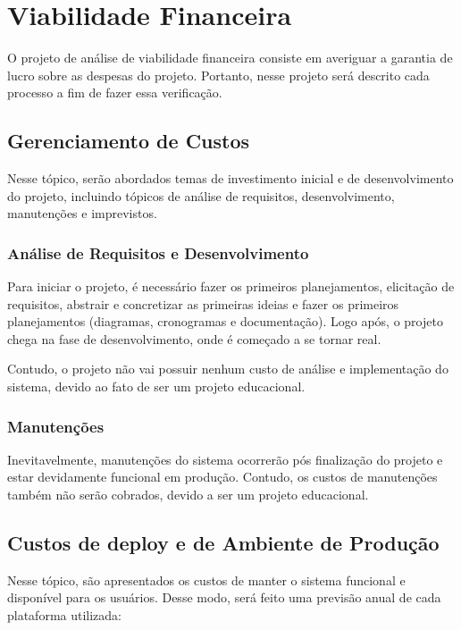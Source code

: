 \chapter{Viabilidade Financeira}

O projeto de análise de viabilidade financeira consiste em averiguar a garantia de lucro sobre as despesas do projeto. Portanto, nesse projeto será descrito cada processo a fim de fazer essa verificação.

\section{Gerenciamento de Custos}

Nesse tópico, serão abordados temas de investimento inicial e de desenvolvimento do projeto, incluindo tópicos de análise de requisitos, desenvolvimento, manutenções e imprevistos.

\subsection{Análise de Requisitos e Desenvolvimento}

Para iniciar o projeto, é necessário fazer os primeiros planejamentos, elicitação de requisitos, abstrair e concretizar as primeiras ideias e fazer os primeiros planejamentos (diagramas, cronogramas e documentação). Logo após, o projeto chega na fase de desenvolvimento, onde é começado a se tornar real.

Contudo, o projeto não vai possuir nenhum custo de análise e implementação do sistema, devido ao fato de ser um projeto educacional.

\subsection{Manutenções}

Inevitavelmente, manutenções do sistema ocorrerão pós finalização do projeto e estar devidamente funcional em produção. Contudo, os custos de manutenções também não serão cobrados, devido a ser um projeto educacional.

\section{Custos de deploy e de Ambiente de Produção}

Nesse tópico, são apresentados os custos de manter o sistema funcional e disponível para os usuários. Desse modo, será feito uma previsão anual de cada plataforma utilizada:

